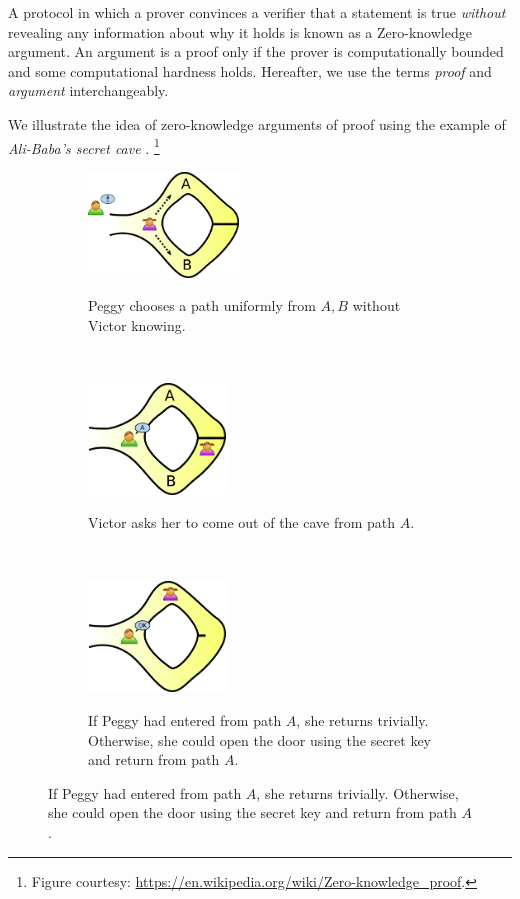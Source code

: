 A protocol in which a prover convinces a verifier that a statement
is true \textit{without} revealing any information about why it holds is known as a Zero-knowledge argument. An argument is a proof only if the prover is computationally bounded and some computational hardness holds. Hereafter, we use the terms \textit{proof} and \textit{argument} interchangeably. 

We illustrate the idea of zero-knowledge arguments of proof using the example of \textit{Ali-Baba's secret cave} \cite{jean89}. \footnote{Figure courtesy: \url{https://en.wikipedia.org/wiki/Zero-knowledge_proof}.}

\begin{figure}[h!]
    \centering
    \begin{subfigure}[b]{0.8\textwidth}
    \centering
        \includegraphics[width=0.44\textwidth]{Figures/Zkip_alibaba1.png}
        \label{fig:bc1}
        \caption{Peggy chooses a path uniformly from $A, B$ without Victor knowing.}
    \end{subfigure}
    \\
    \begin{subfigure}[b]{0.8\textwidth}
    \centering
        \includegraphics[width=0.4\textwidth]{Figures/Zkip_alibaba2.png}
        \label{fig:bc2}
        \caption{Victor asks her to come out of the cave from path $A$.}
    \end{subfigure}
    \\
    \begin{subfigure}[b]{0.8\textwidth}
    \centering
        \includegraphics[width=0.4\textwidth]{Figures/Zkip_alibaba3.png}
        \label{fig:bc3}
        \caption{If Peggy had entered from path $A$, she returns trivially. Otherwise, she could open the door using the secret key and return from path $A$.}
    \end{subfigure}
    

\end{figure}
